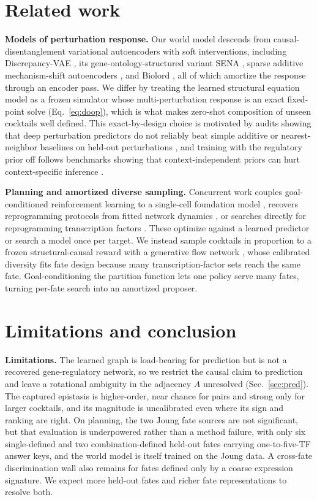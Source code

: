 \documentclass{article}
\begin{document}
\FloatBarrier
\section{Related work}\label{sec:related}
\textbf{Models of perturbation response.} Our world model descends from causal-disentanglement variational
autoencoders with soft interventions, including Discrepancy-VAE \citep{zhang2023discrepancyvae}, its
gene-ontology-structured variant SENA \citep{sena2025}, sparse additive mechanism-shift autoencoders
\citep{samsvae2023}, and Biolord \citep{biolord2024}, all of which amortize the response through an encoder pass.
We differ by treating the learned structural equation model as a frozen simulator whose multi-perturbation
response is an exact fixed-point solve (Eq.~\ref{eq:doop}), which is what makes zero-shot composition of unseen
cocktails well defined. This exact-by-design choice is motivated by audits showing that deep perturbation
predictors do not reliably beat simple additive or nearest-neighbor baselines on held-out perturbations
\citep{ahlmanneltze2025,perturbench2024}, and training with the regulatory prior off follows benchmarks showing
that context-independent priors can hurt context-specific inference \citep{genernib2025}.

\textbf{Planning and amortized diverse sampling.} Concurrent work couples goal-conditioned reinforcement learning
to a single-cell foundation model \citep{dirl2025}, recovers reprogramming protocols from fitted network dynamics
\citep{wytock2024}, or searches directly for reprogramming transcription factors \citep{tfcomb}. These optimize
against a learned predictor or search a model once per target. We instead sample cocktails in proportion to a
frozen structural-causal reward with a generative flow network \citep{bengio2021gflownet}, whose calibrated
diversity fits fate design because many transcription-factor sets reach the same fate. Goal-conditioning the
partition function lets one policy serve many fates, turning per-fate search into an amortized proposer.

\section{Limitations and conclusion}\label{sec:limits}
\textbf{Limitations.} The learned graph is load-bearing for prediction but is not a recovered gene-regulatory
network, so we restrict the causal claim to prediction and leave a rotational ambiguity in the adjacency $A$
unresolved (Sec.~\ref{sec:pred}). The captured epistasis is higher-order, near chance for pairs and strong only
for larger cocktails, and its magnitude is uncalibrated even where its sign and ranking are right. On planning,
the two Joung fate sources are not significant, but that evaluation is underpowered rather than a method failure,
with only six single-defined and two combination-defined held-out fates carrying one-to-five-TF answer keys, and
the world model is itself trained on the Joung data. A cross-fate discrimination wall also remains for fates
defined only by a coarse expression signature. We expect more held-out fates and richer fate representations to
resolve both.
\end{document}
